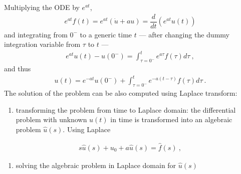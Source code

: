 \documentclass[letterpaper,10pt,english]{jupyterBook}
\begin{document}
\sphinxAtStartPar
Multiplying the ODE by \(e^{a t}\),
\begin{equation*}
\begin{split}e^{a t} f(t) = e^{a t} \left( \dot{u} + a u \right) = \dfrac{d}{dt} \left( e^{at} u(t) \right)\end{split}
\end{equation*}
\sphinxAtStartPar
and integrating from \(0^-\) to a generic time \(t\) — after changing the dummy integration variable from \(\tau\) to \(t\) —
\begin{equation*}
\begin{split}e^{at} u(t) - u(0^-) = \int_{\tau = 0^-}^{t} e^{a \tau} f(\tau) d \tau \ ,\end{split}
\end{equation*}
\sphinxAtStartPar
and thus
\begin{equation*}
\begin{split}u(t) = e^{-at}  u(0^-) + \int_{\tau = 0^-}^{t} e^{-a(t- \tau)} f(\tau) d \tau \ .\end{split}
\end{equation*}
\sphinxAtStartPar
The solution of the problem can be also computed using Laplace transform:
\begin{enumerate}
%
\item {} 
\sphinxAtStartPar
transforming the problem from time to Laplace domain: the differential problem with unknown \(u(t)\) in time is transformed into an algebraic problem \(\hat{u}(s)\). Using Laplace 

\end{enumerate}
\begin{equation*}
\begin{split}s \hat{u}(s) + u_0 + a \hat{u}(s) = \hat{f}(s) \ ,\end{split}
\end{equation*}\begin{enumerate}
%
\setcounter{enumi}{1}
\item {} 
\sphinxAtStartPar
solving the algebraic problem in Laplace domain for \(\hat{u}(s)\)

\end{enumerate}
\end{document}
